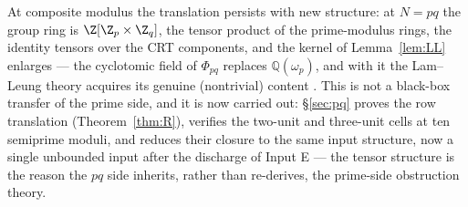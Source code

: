 At composite modulus the translation persists with new structure: at
$N=pq$ the group ring is $\Z[\Z_p\times\Z_q]$, the tensor product of the
prime-modulus rings, the identity tensors over the CRT components, and the
kernel of Lemma~\ref{lem:LL} enlarges --- the cyclotomic field of $\Phi_{pq}$
replaces $\mathbb{Q}(\omega_p)$, and with it the Lam--Leung theory acquires its
genuine (nontrivial) content \cite{LamLeung}. This is not a black-box
transfer of the prime side, and it is now carried out: \S\ref{sec:pq}
proves the row translation (Theorem~\ref{thm:R}), verifies the two-unit
and three-unit cells at ten semiprime moduli, and reduces their closure to
the same input structure, now a single unbounded input after the discharge
of Input E --- the tensor structure is the reason the $pq$ side
inherits, rather than re-derives, the prime-side obstruction theory.
